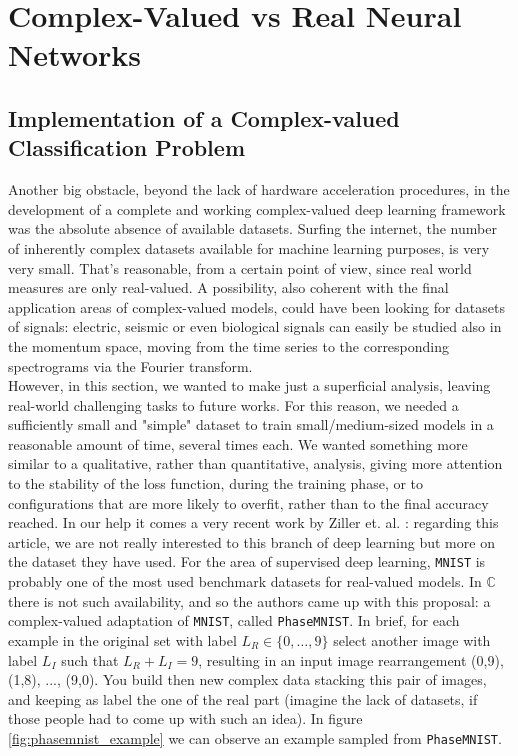\documentclass[../main.tex]{subfiles}
\begin{document}
	
\chapter{Complex-Valued vs Real Neural Networks}
\label{ch:cmplx_vs_real}


\section{Implementation of a Complex-valued Classification Problem}

Another big obstacle, beyond the lack of hardware acceleration procedures, in the development of a complete and working complex-valued deep learning framework was the absolute absence of available datasets. Surfing the internet, the number of inherently complex datasets available for machine learning purposes, is very very small. That's reasonable, from a certain point of view, since real world measures are only real-valued. A possibility, also coherent with the final application areas of complex-valued models, could have been looking for datasets of signals: electric, seismic or even biological signals can easily be studied also in the momentum space, moving from the time series to the corresponding spectrograms via the Fourier transform.\\
However, in this section, we wanted to make just a superficial analysis, leaving real-world challenging tasks to future works. For this reason, we needed a sufficiently small and "simple" dataset to train small/medium-sized models in a reasonable amount of time, several times each. We wanted something more similar to a qualitative, rather than quantitative, analysis, giving more attention to the stability of the loss function, during the training phase, or to configurations that are more likely to overfit, rather than to the final accuracy reached.
In our help it comes a very recent work by Ziller et. al. \cite{ziller2021complexvalued}: regarding this article, we are not really interested to this branch of deep learning but more on the dataset they have used. For the area of supervised deep learning, \texttt{MNIST} is probably one of the most used benchmark datasets for real-valued models. In $\mathds{C}$ there is not such availability, and so the authors came up with this proposal: a complex-valued adaptation of \texttt{MNIST}, called \texttt{PhaseMNIST}. In brief, for each example in the original set with label $L_R\in\{0,\dots,9\}$ select another image with label $L_I$ such that $L_R + L_I = 9$, resulting in an input image rearrangement  (0,9), (1,8), ..., (9,0). You build then new complex data stacking this pair of images, and keeping as label the one of the real part (imagine the lack of datasets, if those people had to come up with such an idea). In figure \ref{fig:phasemnist_example} we can observe an example sampled from \texttt{PhaseMNIST}. 
\end{document}
